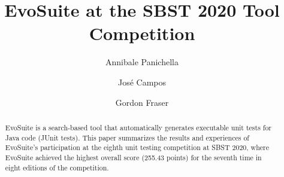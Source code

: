\documentclass[sigconf]{acmart}
\newcommand{\EVOSUITE}{{\sc EvoSuite}\xspace}
\newcommand{\TOTALPOINTS}{{255.43}\xspace}
\begin{document}
\title{\EVOSUITE at the SBST 2020 Tool Competition}

\author{Annibale Panichella}

\author{Jos\'e Campos}

\author{Gordon Fraser}




\begin{abstract}
%
  \EVOSUITE is a search-based tool that automatically generates
  executable unit tests for Java code (JUnit tests).  This paper
  summarizes the results and experiences of \EVOSUITE's participation
  at the eighth unit testing competition at SBST 2020, where \EVOSUITE
  achieved the highest overall score (\TOTALPOINTS points) for the
  seventh time in eight editions of the competition.
\end{abstract}
\end{document}
